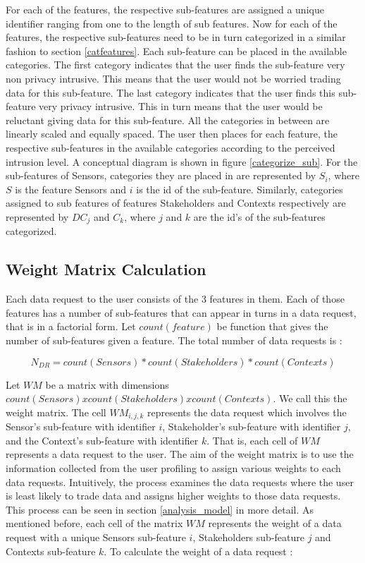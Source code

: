 For each of the features, the respective sub-features are assigned a unique identifier ranging from one to the length of sub features.
Now for each of the features, the respective sub-features need to be in turn categorized in a similar fashion to section \ref{catfeatures}.
Each sub-feature can be placed in the available \numsubcategories categories. The first category indicates that the user finds the sub-feature very
non privacy intrusive. This means that the user would not be worried trading data for this sub-feature. The last category indicates that the user finds this sub-feature very privacy intrusive. This in turn means that the user would be reluctant giving data for this sub-feature. All the categories in between are linearly scaled and equally spaced.
The user then places for each feature, the respective sub-features in the \numsubcategories available categories according to the perceived
intrusion level. A conceptual diagram is shown in figure \ref{categorize_sub}. 
For the sub-features of Sensors, categories they are placed in are represented by $S_{i}$, where $S$ is the feature Sensors and $i$ is the id
of the sub-feature. Similarly, categories assigned to sub features of features Stakeholders and Contexts respectively are represented by $DC_{j}$ and $C_{k}$, where $j$ and $k$ are the id's of the sub-features categorized.




\subsection{Weight Matrix Calculation}
Each data request to the user consists of the 3 features in them. Each of those features has a number of sub-features that can appear in turns in a data request, that is in a factorial form. Let $count(feature)$ be function that gives the number of sub-features given a feature. The total number
of data requests is :

\begin{equation}
N_{DR} =  count(Sensors) * count(Stakeholders) * count(Contexts)    
\end{equation}

Let $WM$  be a matrix with dimensions $count(Sensors) x count(Stakeholders) x count(Contexts)$. We call this the weight matrix.
The cell $WM_{i,j,k}$ represents the data request which involves the Sensor's sub-feature with identifier $i$, Stakeholder's sub-feature with identifier $j$,
and the Context's sub-feature with identifier $k$. That is, each cell of $WM$ represents a data request to the user. The aim of the weight matrix is to use the information collected from the user profiling to assign various weights to each data requests. Intuitively, the process examines the
data requests where the user is least likely to trade data and assigns higher weights to those data requests. This process can be seen in
section \ref{analysis_model} in more detail. As mentioned before, each cell of the matrix $WM$ represents the weight of a data request with a unique Sensors sub-feature $i$, Stakeholders sub-feature $j$ and Contexts sub-feature $k$. To calculate the weight of a data request :

